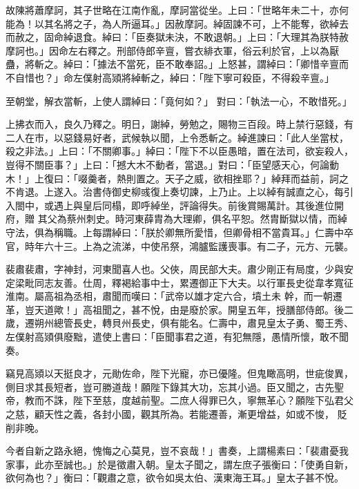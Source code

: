 \begin{pinyinscope}
 故陳將蕭摩訶，其子世略在江南作亂，摩訶當從坐。上曰：「世略年未二十，亦何能為！以其名將之子，為人所逼耳。」因赦摩訶。綽固諫不可，上不能奪，欲綽去而赦之，固命綽退食。綽曰：「臣奏獄未決，不敢退朝。」上曰：「大理其為朕特赦摩訶也。」因命左右釋之。刑部侍郎辛亶，嘗衣緋衣軍，俗云利於官，上以為厭蠱，將斬之。綽曰：「據法不當死，臣不敢奉詔。」上怒甚，謂綽曰：「卿惜辛亶而不自惜也？」命左僕射高熲將綽斬之，綽曰：「陛下寧可殺臣，不得殺辛亶。」



 至朝堂，解衣當斬，上使人謂綽曰：「竟何如？」
 對曰：「執法一心，不敢惜死。」



 上拂衣而入，良久乃釋之。明日，謝綽，勞勉之，賜物三百段。時上禁行惡錢，有二人在市，以惡錢易好者，武候執以聞，上令悉斬之。綽進諫曰：「此人坐當杖，殺之非法。」上曰：「不關卿事。」綽曰：「陛下不以臣愚暗，置在法司，欲妄殺人，豈得不關臣事？」上曰：「撼大木不動者，當退。」對曰：「臣望感天心，何論動木！」上復曰：「啜羹者，熱則置之。天子之威，欲相挫耶？」綽拜而益前，訶之不肯退。上遂入。治書侍御史柳彧復上奏切諫，上乃止。上以綽有誠直之心，每引入閤中，或遇上與皇后同榻，即呼綽坐，評論得失。前後賞賜萬計。其後進位開府，贈
 其父為蔡州刺史。時河東薛胄為大理卿，俱名平恕。然胄斷獄以情，而綽守法，俱為稱職。上每謂綽曰：「朕於卿無所愛惜，但卿骨相不當貴耳。」仁壽中卒官，時年六十三。上為之流涕，中使吊祭，鴻臚監護喪事。有二子，元方、元襲。



 裴肅裴肅，字神封，河東聞喜人也。父俠，周民部大夫。肅少剛正有局度，少與安定梁毗同志友善。仕周，釋褐給事中士，累遷御正下大夫。以行軍長史從韋孝寬征淮南。屬高祖為丞相，肅聞而嘆曰：「武帝以雄才定六合，墳土未
 幹，而一朝遷革，豈天道歟！」高祖聞之，甚不悅，由是廢於家。開皇五年，授膳部侍郎。後二歲，遷朔州總管長史，轉貝州長史，俱有能名。仁壽中，肅見皇太子勇、蜀王秀、左僕射高熲俱廢黜，遣使上書曰：「臣聞事君之道，有犯無隱，愚情所懷，敢不聞奏。



 竊見高熲以天挺良才，元勛佐命，陛下光寵，亦已優隆。但鬼瞰高明，世疵俊異，側目求其長短者，豈可勝道哉！願陛下錄其大功，忘其小過。臣又聞之，古先聖帝，教而不誅，陛下至慈，度越前聖。二庶人得罪已久，寧無革心？願陛下弘君父之慈，顧天性之義，各封小國，觀其所為。若能遷善，漸更增益，如或不悛，
 貶削非晚。



 今者自新之路永絕，愧悔之心莫見，豈不哀哉！」書奏，上謂楊素曰：「裴肅憂我家事，此亦至誠也。」於是徵肅入朝。皇太子聞之，謂左庶子張衡曰：「使勇自新，欲何為也？」衡曰：「觀肅之意，欲令如吳太伯、漢東海王耳。」皇太子甚不悅。




\end{pinyinscope}
